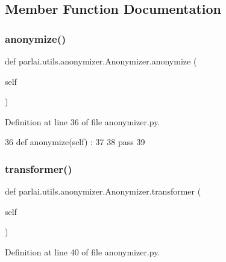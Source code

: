 \subsection{Member Function Documentation}
\mbox{\label{classparlai_1_1utils_1_1anonymizer_1_1Anonymizer_a4853ffad71c52d910e68752ee7a05200}} 
\subsubsection{\texorpdfstring{anonymize()}{anonymize()}}
{\footnotesize\ttfamily def parlai.\+utils.\+anonymizer.\+Anonymizer.\+anonymize (\begin{DoxyParamCaption}\item[{}]{self }\end{DoxyParamCaption})}



Definition at line 36 of file anonymizer.\+py.


\begin{DoxyCode}
36     \textcolor{keyword}{def }anonymize(self) : 
37 
38         \textcolor{keywordflow}{pass}
39 
\end{DoxyCode}
\mbox{\label{classparlai_1_1utils_1_1anonymizer_1_1Anonymizer_a515fed7848150c353175b42ebe7d06c1}} 
\subsubsection{\texorpdfstring{transformer()}{transformer()}}
{\footnotesize\ttfamily def parlai.\+utils.\+anonymizer.\+Anonymizer.\+transformer (\begin{DoxyParamCaption}\item[{}]{self }\end{DoxyParamCaption})}



Definition at line 40 of file anonymizer.\+py.


